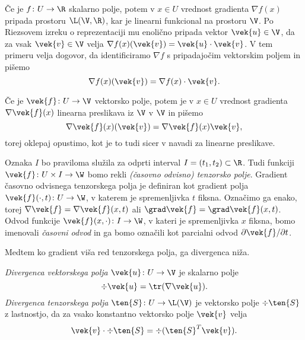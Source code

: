 Če je $f\colon U\to\R$ skalarno polje, potem v $x\in U$ vrednost gradienta $\nabla f(x)$
pripada prostoru $\L(\V,\R)$, kar je linearni funkcional na prostoru $\V$. Po Riezsovem
izreku o reprezentaciji mu enolično pripada vektor $\vek{u}\in\V$, da za vsak
$\vek{v}\in\V$ velja $\nabla f(x)(\vek{v})=\vek{u}\cdot\vek{v}$. V tem primeru velja
dogovor, da identificiramo $\nabla f$ s pripadajočim vektorskim poljem in pišemo
\[ \nabla f(x)(\vek{v})=\nabla f(x)\cdot\vek{v}. \]

Če je $\vek{f}\colon U\to\V$ vektorsko polje, potem je v $x\in U$ vrednost gradienta $\nabla\vek{f}(x)$
linearna preslikava iz $\V$ v $\V$ in pišemo
\[ \nabla\vek{f}(x)(\vek{v})=\nabla\vek{f}(x)\vek{v}, \]
torej oklepaj opustimo, kot je to tudi sicer v navadi za linearne preslikave.

Oznaka $I$ bo praviloma služila za odprti interval $I=(t_1,t_2)\subset\R$. Tudi funkciji
$\vek{f}\colon U\times I\to\W$ bomo rekli \emph{(časovno odvisno) tenzorsko polje}.
Gradient časovno odvisnega tenzorskega polja je definiran kot gradient polja
$\vek{f}(\cdot,t)\colon U\to\W$, v katerem je spremenljivka $t$ fiksna. Označimo
ga enako, torej $\nabla\vek{f}=\nabla\vek{f}(x,t)$ ali $\grad\vek{f}=\grad\vek{f}(x,t)$.
Odvod funkcije $\vek{f}(x,\cdot)\colon I\to\W$, v kateri je spremenljivka $x$ fiksna,
bomo imenovali \emph{časovni odvod} in ga bomo označili kot parcialni odvod
$\partial\vek{f}/\partial t$.

Medtem ko gradient viša red tenzorskega polja, ga divergenca niža.
\begin{definicija} \label{def:div}
	\emph{Divergenca vektorskega polja} $\vek{u}\colon U\to\V$ je skalarno polje
	\begin{equation} \label{e:div1}
		\div\vek{u}=\tr(\nabla\vek{u}).
	\end{equation}
	\emph{Divergenca tenzorskega polja} $\ten{S}\colon U\to\L(\V)$ je vektorsko polje $\div\ten{S}$ z lastnostjo,
	da za vsako konstantno vektorsko polje $\vek{v}$ velja
	\begin{equation} \label{e:div2}
		\vek{v}\cdot\div\ten{S} = \div(\ten{S}^{T}\vek{v}).
	\end{equation}
\end{definicija}

